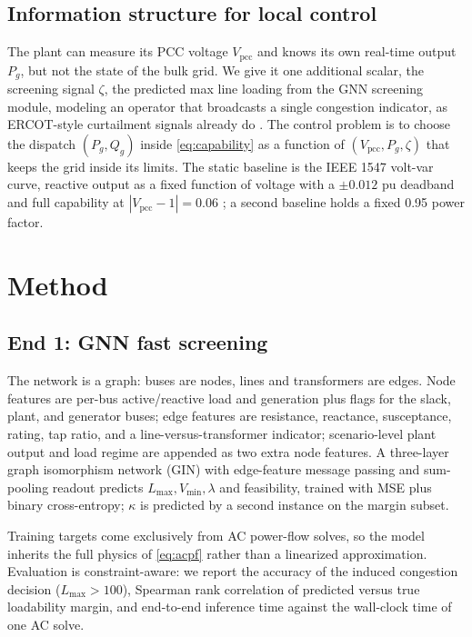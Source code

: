 \documentclass{article}
\newcommand{\pcc}{\mathrm{pcc}}
\newcommand{\zt}{\zeta}
\newcommand{\citep}[1]{\cite{#1}}
\begin{document}
\subsection{Information structure for local control}
The plant can measure its PCC voltage $V_{\pcc}$ and knows its own real-time
output $P_g$, but not the state of the bulk grid. We give it one additional
scalar, the screening signal $\zt$, the predicted max line loading from the
GNN screening module, modeling an operator that broadcasts a single
congestion indicator, as ERCOT-style curtailment signals already do
\citep{gorman2025grid}. The control problem is to choose the dispatch
$(P_g,Q_g)$ inside \eqref{eq:capability} as a function of
$(V_{\pcc},P_g,\zt)$ that keeps the grid inside its limits. The static
baseline is the IEEE 1547 volt-var curve, reactive output as a fixed
function of voltage with a $\pm 0.012$ pu deadband and full capability at
$|V_{\pcc}-1|=0.06$ \citep{ieee1547}; a second baseline holds a fixed 0.95
power factor.

\section{Method}

\subsection{End 1: GNN fast screening}
The network is a graph: buses are nodes, lines and transformers are edges.
Node features are per-bus active/reactive load and generation plus flags
for the slack, plant, and generator buses; edge features are resistance,
reactance, susceptance, rating, tap ratio, and a line-versus-transformer
indicator; scenario-level plant output and load regime are appended as two
extra node features. A three-layer graph isomorphism network (GIN)
\citep{xu2019gin} with edge-feature message passing and sum-pooling readout
predicts $L_{\max}, V_{\min}, \lambda$ and feasibility, trained with MSE
plus binary cross-entropy; $\kappa$ is predicted by a second instance on
the margin subset.

Training targets come exclusively from AC power-flow solves, so the model
inherits the full physics of \eqref{eq:acpf} rather than a linearized
approximation. Evaluation is constraint-aware: we report the accuracy of the
induced congestion decision ($L_{\max}>100$), Spearman rank correlation of
predicted versus true loadability margin, and end-to-end inference time
against the wall-clock time of one AC solve.
\end{document}
